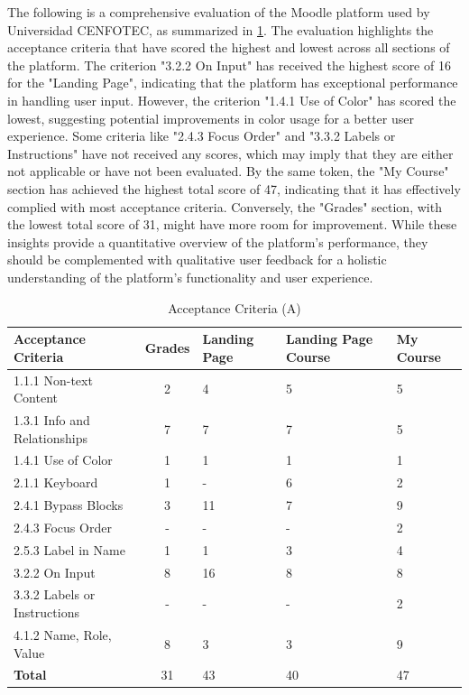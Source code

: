 \documentclass{IEEEtran}
\begin{document}
The following is a comprehensive evaluation of the Moodle platform used by Universidad CENFOTEC, as summarized in \ref{tab:table1}. The evaluation highlights the acceptance criteria that have scored the highest and lowest across all sections of the platform. The criterion "3.2.2 On Input" has received the highest score of 16 for the "Landing Page", indicating that the platform has exceptional performance in handling user input. However, the criterion "1.4.1 Use of Color" has scored the lowest, suggesting potential improvements in color usage for a better user experience. Some criteria like "2.4.3 Focus Order" and "3.3.2 Labels or Instructions" have not received any scores, which may imply that they are either not applicable or have not been evaluated. By the same token, the "My Course" section has achieved the highest total score of 47, indicating that it has effectively complied with most acceptance criteria. Conversely, the "Grades" section, with the lowest total score of 31, might have more room for improvement. While these insights provide a quantitative overview of the platform's performance, they should be complemented with qualitative user feedback for a holistic understanding of the platform's functionality and user experience.
\begin{table}[h]
    \centering
    \caption{Acceptance Criteria (A)}
    \label{tab:table1}
    \begin{tabularx}{\columnwidth}{|X|c|X|X|X|}
    \hline
    \textbf{Acceptance Criteria} & \textbf{Grades} & \textbf{Landing Page} & \textbf{Landing Page Course} & \textbf{My Course} \\ 
    \hline
    1.1.1 Non-text Content & 2 & 4 & 5 & 5 \\ 
    \hline
    1.3.1 Info and Relationships & 7 & 7 & 7 & 5 \\
    \hline
    1.4.1 Use of Color & 1 & 1 & 1 & 1 \\
    \hline
    2.1.1 Keyboard & 1 & - & 6 & 2 \\
    \hline
    2.4.1 Bypass Blocks & 3 & 11 & 7 & 9 \\
    \hline
    2.4.3 Focus Order & - & - & - & 2 \\
    \hline
    2.5.3 Label in Name & 1 & 1 & 3 & 4 \\
    \hline
    3.2.2 On Input & 8 & 16 & 8 & 8 \\
    \hline
    3.3.2 Labels or Instructions & - & - & - & 2 \\
    \hline
    4.1.2 Name, Role, Value & 8 & 3 & 3 & 9 \\
    \hline
    \textbf{Total} & 31 & 43 & 40 & 47 \\
    \hline
    \end{tabularx}
\end{table}
\end{document}
